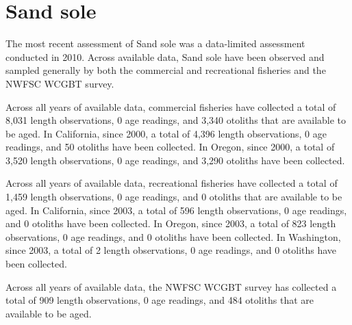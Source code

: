 \documentclass[11pt,
  english,
  letterpaper,
]{article}
\begin{document}
\leavevmode\tagmcend\tagstructend\par
\endgroup{}
\endgroup{}


\hypertarget{sand-sole}{%
\section{Sand sole}\label{sand-sole}}

\leavevmode\tagmcend\tagstructend


The most recent assessment of Sand sole was a data-limited assessment conducted in 2010. Across available data, Sand sole have been observed and sampled generally by both the commercial and recreational fisheries and the NWFSC WCGBT survey.

\leavevmode\tagmcend\tagstructend\par


Across all years of available data, commercial fisheries have collected a total of 8,031 length observations, 0 age readings, and 3,340 otoliths that are available to be aged. In California, since 2000, a total of 4,396 length observations, 0 age readings, and 50 otoliths have been collected. In Oregon, since 2000, a total of 3,520 length observations, 0 age readings, and 3,290 otoliths have been collected.

\leavevmode\tagmcend\tagstructend\par


Across all years of available data, recreational fisheries have collected a total of 1,459 length observations, 0 age readings, and 0 otoliths that are available to be aged. In California, since 2003, a total of 596 length observations, 0 age readings, and 0 otoliths have been collected. In Oregon, since 2003, a total of 823 length observations, 0 age readings, and 0 otoliths have been collected. In Washington, since 2003, a total of 2 length observations, 0 age readings, and 0 otoliths have been collected.

\leavevmode\tagmcend\tagstructend\par


Across all years of available data, the NWFSC WCGBT survey has collected a total of 909 length observations, 0 age readings, and 484 otoliths that are available to be aged.
\end{document}
